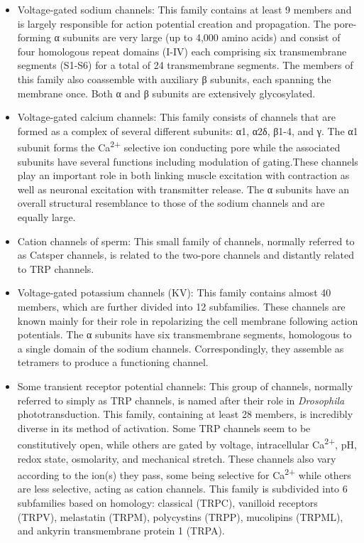 \begin{itemize}
\tightlist
\item
  Voltage-gated sodium channels: This family contains at least 9 members and is largely responsible for action potential creation and propagation. The pore-forming α subunits are very large (up to 4,000 amino acids) and consist of four homologous repeat domains (I-IV) each comprising six transmembrane segments (S1-S6) for a total of 24 transmembrane segments. The members of this family also coassemble with auxiliary β subunits, each spanning the membrane once. Both α and β subunits are extensively glycosylated.
\item
  Voltage-gated calcium channels: This family consists of channels that are formed as a complex of several different subunits: α1, α2δ, β1-4, and γ. The α1 subunit forms the Ca\textsuperscript{2+} selective ion conducting pore while the associated subunits have several functions including modulation of gating.These channels play an important role in both linking muscle excitation with contraction as well as neuronal excitation with transmitter release. The α subunits have an overall structural resemblance to those of the sodium channels and are equally large.
\item
  Cation channels of sperm: This small family of channels, normally referred to as Catsper channels, is related to the two-pore channels and distantly related to TRP channels.
\item
  Voltage-gated potassium channels (KV): This family contains almost 40 members, which are further divided into 12 subfamilies. These channels are known mainly for their role in repolarizing the cell membrane following action potentials. The α subunits have six transmembrane segments, homologous to a single domain of the sodium channels. Correspondingly, they assemble as tetramers to produce a functioning channel.
\item
  Some transient receptor potential channels: This group of channels, normally referred to simply as TRP channels, is named after their role in \emph{Drosophila} phototransduction. This family, containing at least 28 members, is incredibly diverse in its method of activation. Some TRP channels seem to be constitutively open, while others are gated by voltage, intracellular Ca\textsuperscript{2+}, pH, redox state, osmolarity, and mechanical stretch. These channels also vary according to the ion(s) they pass, some being selective for Ca\textsuperscript{2+} while others are less selective, acting as cation channels. This family is subdivided into 6 subfamilies based on homology: classical (TRPC), vanilloid receptors (TRPV), melastatin (TRPM), polycystins (TRPP), mucolipins (TRPML), and ankyrin transmembrane protein 1 (TRPA).

\end{itemize}
